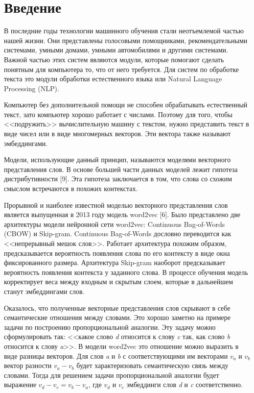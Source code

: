 \documentclass[a4paper,14pt]{article}
\begin{document}
\pagebreak

\tableofcontents
\pagebreak

\section*{Введение}

В последние годы технологии машинного обучения стали неотъемлемой частью нашей жизни. 
Они представлены голосовыми помощниками, рекомендательными системами, умными домами, умными автомобилями и другими системами.
Важной частью этих систем являются модули, которые помогают сделать понятным для компьютера то, что от него требуется.
Для систем по обработке текста это модули обработки естественного языка или Natural Language Processing (NLP).

Компьютер без дополнительной помощи не способен обрабатывать естественный текст, зато компьютер хорошо работает с числами.
Поэтому для того, чтобы <<подружить>> вычислительную машину с текстом, нужно представить текст в виде чисел или в виде многомерных векторов.
Эти вектора также называют эмбеддингами.

Модели, использующие данный принцип, называются моделями векторного представления слов.
В основе большей части данных моделей лежит гипотеза дистрибутивности [9].
Эта гипотеза заключается в том, что слова со схожим смыслом встречаются в похожих контекстах.

Прорывной и наиболее известной моделью векторного представления слов является выпущенная в 2013 году модель word2vec [6].
Было представлено две архитектуры модели нейронной сети word2vec: Continuous Bag-of-Words
(CBOW) и Skip-gram. 
Continuous Bag-of-Words дословно переводится как <<непрерывный мешок слов>>.
Работает архитектура похожим образом, предсказывается вероятность появления слова по его контексту в виде окна фиксированного размера.
Архитектура Skip-gram наоборот предсказывает вероятность появления контекста у заданного слова.
В процессе обучения модель корректирует веса между входным и скрытым слоем, которые в дальнейшем станут эмбеддингами слов.

Оказалось, что полученные векторные представления слов скрывают в себе семантические отношения между словами.
Это хорошо заметно на примере задачи по построению пропорциональной аналогии.
Эту задачу можно сформулировать так: <<какое слово \textit{d} относится к слову \textit{c} так, 
как слово \textit{b} относится к слову \textit{a}>>.
В модели word2vec это отношение можно выразить в виде разницы векторов.
Для слов \textit{a} и \textit{b} с соответствующими им векторами $v_a$ и $v_b$ вектор разности $v_a - v_b$ будет характеризовать семантическую связь между словами.
Тогда для решением задачи пропорциональной аналогии будет выражение $v_d - v_c = v_b - v_a$, где $v_d$ и $v_c$ эмбеддинги слов \textit{d} и \textit{c} соответственно.
\end{document}
